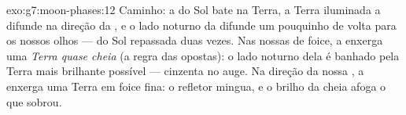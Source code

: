 \begin{solution}{exo:g7:moon-phases:12}
Caminho: a  do Sol bate na Terra, a Terra iluminada a difunde na
direção da , e o lado noturno da  difunde um pouquinho de volta
para os nossos olhos ---  do Sol repassada duas vezes. Nas nossas
 de foice, a  enxerga uma \emph{Terra quase cheia} (a regra
das  opostas): o lado noturno dela é banhado pela Terra mais
brilhante possível ---  cinzenta no auge. Na direção da nossa , a  enxerga uma Terra em foice fina: o refletor mingua, e o
brilho da  cheia afoga o que sobrou.
\end{solution}

